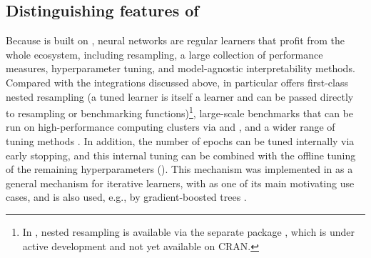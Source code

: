 \documentclass[article,shortnames]{jss}
\theoremstyle{definition}
\begin{document}
\subsection[Distinguishing features of mlr3torch]{Distinguishing features of \mlrttorch{}}\label{sec:distinguishing}

Because \mlrttorch{} is built on \mlrt{}, neural networks are regular learners that profit from the whole ecosystem, including resampling, a large collection of performance measures, hyperparameter tuning, and model-agnostic interpretability methods.
Compared with the \tidymodels{} integrations discussed above, \mlrt{} in particular offers first-class nested resampling (a tuned learner is itself a learner and can be passed directly to resampling or benchmarking functions)\footnote{In \tidymodels{}, nested resampling is available via the separate  package \citep{ref-nestedtune}, which is under active development and not yet available on CRAN.}, large-scale benchmarks that can be run on high-performance computing clusters via  \citep{ref-mlr3batchmark} and  \citep{ref-batchtools2017}, and a wider range of tuning methods \citep{ref-mlr3tuning2024, ref-mlr3mbo, ref-mlr3hyperband}.
In addition, the number of epochs can be tuned internally via early stopping, and this internal tuning can be combined with the offline tuning of the remaining hyperparameters ().
This mechanism was implemented in \mlrt{} as a general mechanism for iterative learners, with \mlrttorch{} as one of its main motivating use cases, and is also used, e.g., by gradient-boosted trees \citep{ref-mlr3book-valid}.
\end{document}
